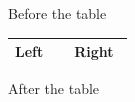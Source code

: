 Before the table

\par\medskip
\begin{longtable}{|p{0.45\linewidth}|p{0.45\linewidth}|}
\hline
Left

 & Right

 \\
\hline
\end{longtable}
\medskip
After the table

